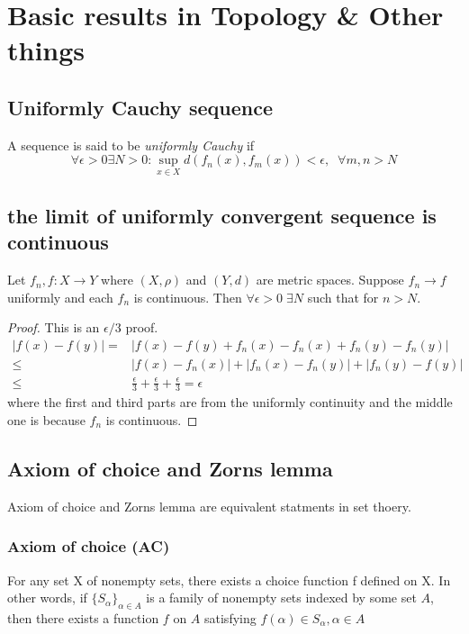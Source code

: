 \documentclass[titlepage]{article}
\begin{document}
\tableofcontents
\newpage
\section{Basic results in Topology \& Other things}
\subsection{Uniformly Cauchy sequence}
A sequence is said to be \textit{uniformly Cauchy} if
\begin{equation}
\forall \epsilon > 0 \exists N > 0 : \sup_{x\in X} d(f_n(x),f_m(x)) < \epsilon, \; \; \forall m,n > N
\end{equation}
\subsection{the limit of uniformly convergent sequence is continuous}
Let $f_n, f: X\rightarrow Y$ where $(X,\rho)$ and $(Y,d)$ are metric spaces. Suppose $f_n \rightarrow f$ uniformly and each $f_n$ is continuous. Then $\forall \epsilon >0 \; \exists N$ such that for $n>N$.
\begin{proof}
This is an $\epsilon/3$ proof. 
\begin{equation}
\begin{split}
|f(x) - f(y)| =&  |f(x) -f(y) +f_n(x) - f_n(x) + f_n(y) - f_n(y)|  \\ 
   \leq &  |f(x) - f_n(x)| + |f_n(x) - f_n(y)| + |f_n(y) - f(y)| \\
   \leq & \frac{\epsilon}{3} +\frac{\epsilon}{3} +\frac{\epsilon}{3} = \epsilon
\end{split}
\end{equation}
where the first and third parts are from the uniformly continuity and the middle one is because $f_n$ is continuous.
\end{proof}




\subsection{Axiom of choice and Zorns lemma}
Axiom of choice and Zorns lemma are equivalent statments in set thoery.
\subsubsection{Axiom of choice (AC)} 
For any set X of nonempty sets, there exists a choice function f defined on X.
In other words, if $\{S_\alpha\}_{\alpha \in A}$ is a family of nonempty sets indexed by some set $A$, then there exists a function $f$ on $A$ satisfying $f(\alpha) \in S_\alpha, \alpha \in A$
\end{document}
